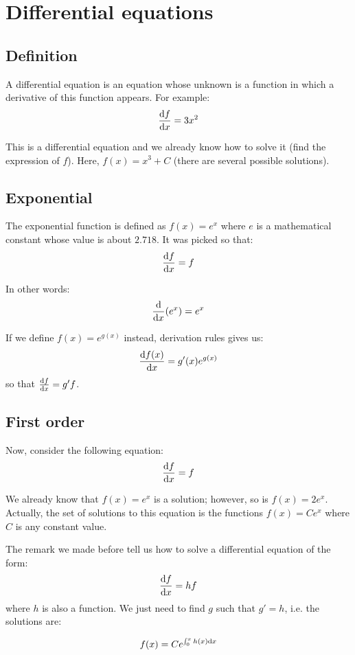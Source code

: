 \section{Differential equations}


\subsection{Definition}

A differential equation is an equation whose unknown is a function in
which a derivative of this function appears. For example:
\[
\frac {\mathrm{d} f} {\mathrm{d} x} = 3x^2
\]

This is a differential equation and we already know how to solve it
(find the expression of $f$). Here, $f(x) = x^3 + C$ (there are several
possible solutions).


\subsection{Exponential}

The exponential function is defined as $f(x) = e^x$ where $e$ is a
mathematical constant whose value is about $2.718$. It was picked so that:
\[
\frac {\mathrm{d} f} {\mathrm{d} x} = f
\]

In other words:
\[
\frac {\mathrm{d}} {\mathrm{d} x} (e^x) = e^x
\]

\begin{remark}
If we define $f(x) = e^{g(x)}$ instead, derivation rules
gives us:
\[
\frac {\mathrm{d} f(x)} {\mathrm{d} x}
= g'(x) e^{g(x)}
\]
so that $\frac {\mathrm{d} f} {\mathrm{d} x} = g' f$.
\end{remark}


\subsection{First order}

Now, consider the following equation:
\[
\frac {\mathrm{d} f} {\mathrm{d} x} = f
\]

We already know that $f(x) = e^x$ is a solution; however, so is $f(x) =
2 e^x$. Actually, the set of solutions to this equation is the functions
$f(x) = C e^x$ where $C$ is any constant value.

The remark we made before tell us how to solve a differential equation
of the form:
\[
\frac {\mathrm{d} f} {\mathrm{d} x} = h f
\]
where $h$ is also a function. We just need to find $g$ such that $g' =
h$, i.e. the solutions are:

\[
f(x) = C e^{\int_0^x h(x) \mathrm{d} x}
\]



